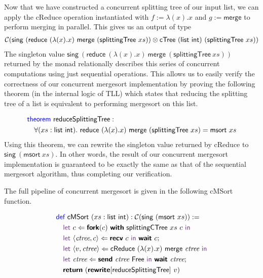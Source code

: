 Now that we have constructed a concurrent splitting tree of our input list, we can
apply the \textsf{cReduce} operation instantiated with $f := \lambda(x). x$
and $g := \textsf{merge}$ to perform merging in parallel.
This gives us an output of type
\begin{align*}
  \CM{\textsf{sing}\ (\textsf{reduce}\ (\lambda(x). x)\ \textsf{merge}\ (\textsf{splittingTree}\ xs)) \otimes \textsf{cTree}\ (\textsf{list}\ \textsf{int})\ (\textsf{splittingTree}\ xs)} 
\end{align*}
The singleton value 
$\textsf{sing}\ (\textsf{reduce}\ (\lambda(x). x)\ \textsf{merge}\ (\textsf{splittingTree}\ xs))$
returned by the monad relationally describes this series of concurrent computations using just 
sequential operations. This allows us to easily verify the correctness of our concurrent mergesort
implementation by proving the following theorem (in the internal logic of TLL) which states that 
reducing the splitting tree of a list is equivalent to performing mergesort on this list.

\vspace{-1em}
\begingroup
\small
\addtolength{\jot}{-0.2em}
\begin{align*}
  &\Theorem\ \textsf{reduceSplittingTree} : \\
  &\quad\forall (xs : \textsf{list}\ \textsf{int}).\ \textsf{reduce}\ (\lambda(x). x)\ \textsf{merge}\ (\textsf{splittingTree}\ xs) = \textsf{msort}\ xs
\end{align*}
\endgroup
Using this theorem, we can rewrite the singleton value returned by \textsf{cReduce} to
$\textsf{sing}\ (\textsf{msort}\ xs)$. In other words, the result of our concurrent
mergesort implementation is guaranteed to be exactly the same as that of the sequential
mergesort algorithm, thus completing our verification.

The full pipeline of concurrent mergesort is given in the following \textsf{cMSort} function.

\vspace{-1em}
\begingroup
\small
\addtolength{\jot}{-0.2em}
\begin{align*}
  &\Def\ \textsf{cMSort}\ (xs : \textsf{list}\ \textsf{int}) : \CM{\textsf{sing}\ (\textsf{msort}\ xs)} := \\
  &\quad\Let\ c \Leftarrow \Fork(c)\ \With\ \textsf{splittingCTree}\ xs\ c\ \In \\ 
  &\quad\Let\ \langle{\textit{ctree}, c}\rangle \Leftarrow \Recv\ c\ \In\ \Wait\ c; \\
  &\quad\Let\ \langle{v, \textit{ctree}}\rangle \Leftarrow \textsf{cReduce}\ (\lambda(x). x)\ \textsf{merge}\ \textit{ctree}\ \In \\
  &\quad\Let\ \textit{ctree} \Leftarrow \Send\ \textit{ctree}\ \textsf{Free}\ \In\ \Wait\ \textit{ctree}; \\
  &\quad\Return\ (\Rewrite[\textsf{reduceSplittingTree}]\ v)
\end{align*}
\endgroup

